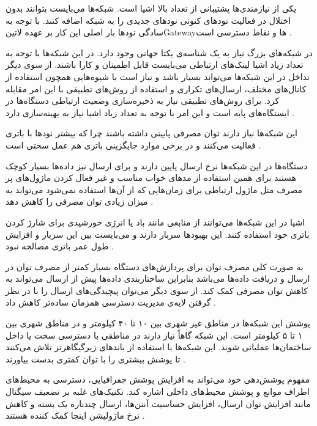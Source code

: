 یکی از نیازمندی‌ها پشتیبانی از تعداد بالا اشیا است. شبکه‌ها می‌بایست بتوانند بدون اختلال در فعالیت نودهای کنونی نودهای جدیدی را به شبکه اضافه کنند.
با توجه به سادگی نودها بار اصلی این کار بر عهده ‌لاتین{Gateway}ها و نقاط دسترسی است
.

در شبکه‌های بزرگ نیاز به یک شناسه‌ی یکتا جهانی وجود دارد.
در این شبکه‌ها با توجه به تعداد زیاد اشیا لینک‌های ارتباطی می‌بایست قابل اطمینان و کارا باشند.
از سوی دیگر تداخل در این شبکه‌ها می‌تواند بسیار باشد و نیاز است با شیوه‌هایی همچون استفاده از کانال‌های مختلف،
ارسال‌های تکراری و استفاده از روش‌های تطبیقی با این امر مقابله کرد.
برای روش‌های تطبیقی نیاز به ذخیره‌سازی وضعیت ارتباطی دستگاه‌ها در ایستگاه‌های پایه است و این امر با توجه به تعداد زیاد
اشیا نیاز به بهینه‌سازی دارد
.


این شبکه‌ها نیاز دارند توان مصرفی پایینی داشته باشند چرا که بیشتر نودها با باتری فعالیت می‌کنند
و در برخی موارد جایگزینی باتری هم عمل سختی است
.

دستگاه‌ها در این شبکه‌ها نرخ ارسال پایین دارند و برای ارسال نیز داده‌ها بسیار کوچک هستند
برای همین استفاده از مدهای خواب مناسب و غیر فعال کردن ماژول‌های پر مصرف مثل ماژول
ارتباطی برای زمان‌هایی که از آن‌ها استفاده نمی‌شود می‌تواند به میزان زیادی توان مصرفی را کاهش دهد
.

اشیا در این شبکه‌ها می‌توانند از منابعی مانند باد یا انرژی خورشیدی برای شارژ کردن باتری خود استفاده کنند.
این بهبودها سربار دارند و می‌بایست بین این سربار و افزایش طول عمر باتری مصالحه نبود
.

به صورت کلی مصرف توان برای پردازش‌های دستگاه بسیار کمتر از مصرف توان در ارسال و دریافت داده‌ها می‌باشد
بنابراین ساختاربندی داده‌ها پیش از ارسال می‌تواند به کاهش توان مصرفی کمک کند. از سوی دیگر می‌توان پیچیدگی‌های
ارسال را با در نظر گرفتن لایه‌ی مدیریت دسترسی همزمان ساده‌تر کاهش داد
.


پوشش این شبکه‌ها در مناطق غیر شهری بین ۱۰ تا ۴۰ کیلومتر و
در مناطق شهری بین ۱ تا ۵ کیلومتر است.
این شبکه گاهاً نیاز دارند در مناطقی با دسترسی سخت یا داخل ساختمان‌ها
عملیاتی شوند. این شبکه‌ها با استفاده از باندهای زیرگیگاهرتز تلاش می‌کنند تا پوشش بیشتری را با توان کمتری بدست بیاورند
.

مفهوم پوشش‌دهی خود می‌تواند به افزایش پوشش جفرافیایی، دسترسی به محیط‌های اطراف موانع و پوشش محیط‌های داخلی اشاره کند.
تکنیک‌های غلبه بر تضعیف سیگنال مانند افزایش توان ارسال، افزایش حساسیت آنتن‌ها، ارسال چندباره یک بسته و کاهش نرخ ماژولیشن اینجا کمک کننده هستند
.


